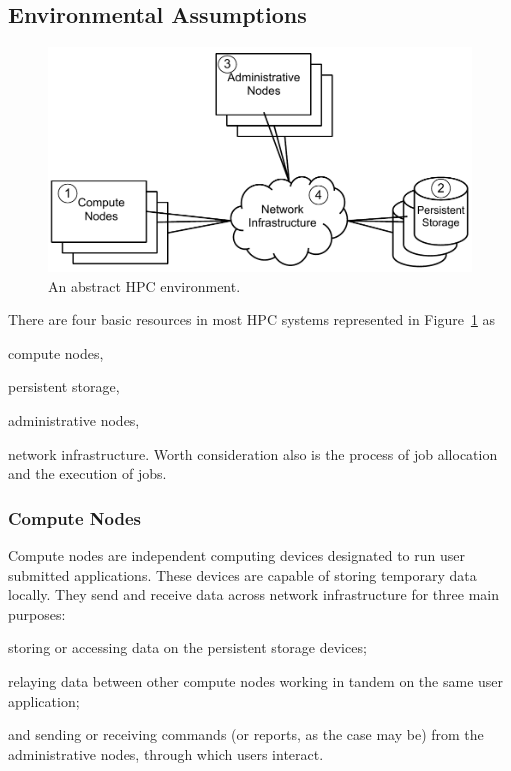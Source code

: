 \documentclass{llncs}
\begin{document}
\subsection{Environmental Assumptions}
\begin{figure}
\centering
\includegraphics[scale=0.5]{abstract_hpc_environment.pdf}
\caption{An abstract HPC environment.}
\label{fig:abstract_hpc_environment}
\end{figure}
There are four basic resources in most HPC systems represented in Figure~\ref{fig:abstract_hpc_environment} as \begin{inparaenum}
\item compute nodes, \item persistent storage, \item administrative nodes, \item network infrastructure. Worth consideration also is the process of job allocation and the execution of jobs.\end{inparaenum}
\subsubsection{Compute Nodes}
Compute nodes are independent computing devices designated to run user submitted applications. These devices are capable of storing temporary data locally. They send and receive data across network infrastructure for three main purposes:\begin{inparaenum}
\item storing or accessing data on the persistent storage devices;
\item relaying data between other compute nodes working in tandem on the same user application;
\item and sending or receiving commands (or reports, as the case may be) from the administrative nodes, through which users interact.\end{inparaenum} 
\end{document}

